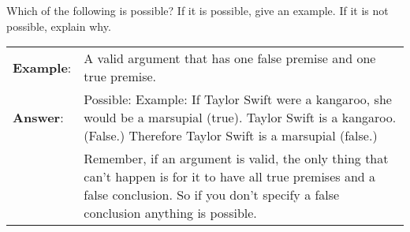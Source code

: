 \noindent \problempart \label{pr.EnglishCombinations} Which of the following is possible? If it is possible, give an example. If it is not possible, explain why.


\begin{longtabu}{p{.1\linewidth}p{.9\linewidth}}
\textbf{Example}: & A valid argument that has one false premise and one true premise.\\
\textbf{Answer}: & Possible: Example: If Taylor Swift were a kangaroo, she would be a marsupial (true). Taylor Swift is a kangaroo. (False.) Therefore Taylor Swift is a marsupial (false.)\\ &Remember, if an argument is valid, the only thing that can't happen is for it to have all true premises and a false conclusion. So if you don't specify a false conclusion anything is possible.\\
\end{longtabu}




